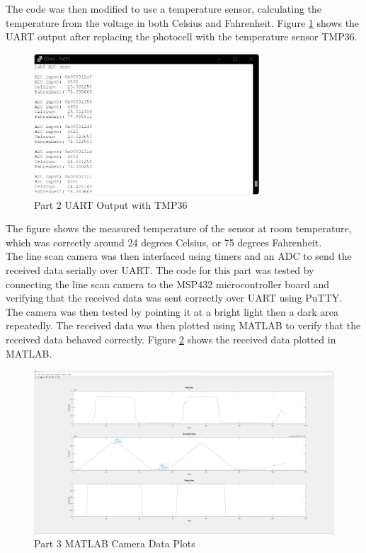 \documentclass[CMPE]{KGCOEReport}
\begin{document}
The code was then modified to use a temperature sensor, calculating the temperature from the voltage in both Celsius and Fahrenheit. Figure \ref{fig:part2b} shows the UART output after replacing the photocell with the temperature sensor TMP36.

\begin{figure}[H]
    \centering
    \includegraphics[width=0.75\textwidth]{part2b.png}
    \caption{Part 2 UART Output with TMP36}
    \label{fig:part2b}
\end{figure}

The figure shows the measured temperature of the sensor at room temperature, which was correctly around 24 degrees Celsius, or 75 degrees Fahrenheit.\\

The line scan camera was then interfaced using timers and an ADC to send the received data serially over UART. The code for this part was tested by connecting the line scan camera to the MSP432 microcontroller board and verifying that the received data was sent correctly over UART using PuTTY.\\

The camera was then tested by pointing it at a bright light then a dark area repeatedly. The received data was then plotted using MATLAB to verify that the received data behaved correctly. Figure \ref{fig:part3} shows the received data plotted in MATLAB.

\begin{figure}[H]
    \centering
    \includegraphics[width=1.00\textwidth]{part3.png}
    \caption{Part 3 MATLAB Camera Data Plots}
    \label{fig:part3}
\end{figure}
\end{document}
